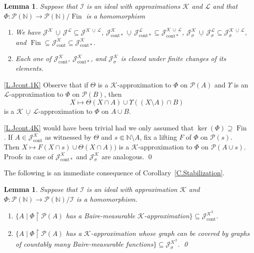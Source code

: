 \documentclass{amsart}
\makeatletter
\def\p{{\mathcal P}}              %
\def\N{\mathbb N}                        %
\def\Fin{{\rm Fin}}   %
\def\rs{\restriction}
\newtheorem{lemma}[proposition]{Lemma}
\theoremstyle{definition}
\theoremstyle{remark}
\newcommand{\ucup}{\,\underline{\cup}\,}
\def\Fin{\operatorname{Fin}}
\DeclareMathOperator{\Ccont}{cont}
\newcommand{\Jcont}{\cJ_{\Ccont}}
\newcommand{\Jcontnm}{\cJ_{\mathrm{cont*}}}
\newcommand{\Jsigma}{\cJ_\sigma}
\newcommand{\cK}{{\mathcal K}}
\renewcommand{\proofname}{Proof}
\renewenvironment{proof}[1][\proofname]{\par
\let\oldqedsymbol\qedsymbol             %
  \normalfont
  \topsep6\p@\@plus6\p@ \trivlist
  \item[\hskip\labelsep\hskip\parindent\scshape
    #1\@addpunct{.}]\ignorespaces
}{%
  \qed\endtrivlist
\global\let\qedsymbol\oldqedsymbol      %
}
\newcommand{\cP}{\mathcal P}
\newcommand{\calL}{\mathcal L}
\newcommand{\bbN}{\mathbb N}
\newcommand{\cI}{{\mathcal I}} %
\newcommand{\cJ}{{\mathcal J}} %
\numberwithin{claim}{subsection}
\makeatother
\begin{document}
\begin{lemma}\label{L.JcontJ1JsigmaK}
	Suppose that $\cI$ is an ideal with approximations $\cK$ and $\calL$ and that $\Phi\colon \p(\N)\to \p(\N)/\Fin$
	is a  homomorphism
	
	\begin{enumerate}
		\item \label{L.Jcont.1K} We have $\cJ^\cK\ucup \cJ^\calL\subseteq \cJ^{\cK\ucup \calL}$, $\Jcontnm^\cK\ucup \Jcontnm^\calL\subseteq \Jcontnm^{\cK\ucup \calL}$, $\cJ_\sigma^\cK\ucup \cJ_\sigma^\calL\subseteq \cJ_\sigma^{\cK\ucup\calL}$, and $\Fin\subseteq \Jcont^\cK\subseteq  \Jcontnm^\cK$. 
		\item \label{L.Jcont.4K} Each one of $\Jcont^\cK$, $\Jcontnm^\cK$, and $\Jsigma^\cK$ is closed under finite changes of its elements. 
	\end{enumerate} 
\end{lemma}

\begin{proof} \eqref{L.Jcont.1K} Observe that if $\Theta$ is a $\cK$-approximation to $\Phi$ on $\cP(A)$ and $\Upsilon$ is an $\calL$-approximation to $\Phi$ on $\cP(B)$, then 
	\[
	X\mapsto \Theta(X\cap A)\cup \Upsilon ((X\setminus A)\cap B)
	\]
is a $\cK\ucup \calL$-approximation to $\Phi$ on $A\cup B$. 


\eqref{L.Jcont.4K} would have been  trivial had we only assumed that $\ker(\Phi)\supseteq \Fin$. If $A\in \Jcont^\cK$ as witnessed by $\Theta$  and $s\Subset \bbN\setminus A$, fix a lifting $F$ of $\Phi$ on $\cP(s)$. Then $X\mapsto F(X\cap s)\cup \Theta(X\cap A))$ is a $\cK$-approximation to $\Phi$ on $\cP(A\cup s)$. Proofs in case of $\Jcontnm^\cK$ and $\Jsigma^\cK$  are analogous. 
\end{proof}

The following is an immediate consequence of Corollary~\ref{C.Stabilization}.  

\begin{lemma} \label{L.K-baire-to-ctns}
	Suppose that  $\cI$ is an ideal with approximation $\cK$ and  $\Phi\colon \p(\N)\to \p(\N)/\cI$
	is a  homomorphism.
	\begin{enumerate}
		\item $\{A\mid \Phi\rs \cP(A)$ has a Baire-measurable $\cK$-approximation$\}\subseteq \Jcont^{\cK^2}$. 
		\item $\{A\mid \Phi\rs \cP(A)$ has a  $\cK$-approximation whose graph can be covered by graphs of countably many Baire-measurable functions$\}\subseteq\Jsigma^{\cK^2}$. \qed
	\end{enumerate}
\end{lemma}
\end{document}
